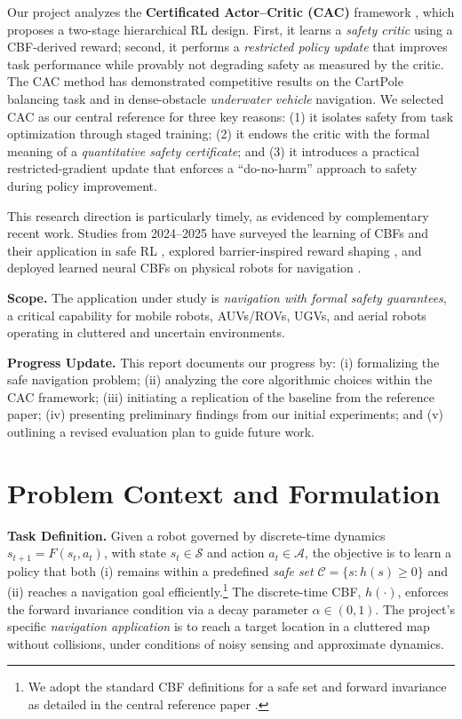 \documentclass[10pt,conference]{IEEEtran}
\begin{document}
Our project analyzes the \textbf{Certificated Actor--Critic (CAC)} framework \cite{Xie2025CAC}, which proposes a two-stage hierarchical RL design. First, it learns a \emph{safety critic} using a CBF-derived reward; second, it performs a \emph{restricted policy update} that improves task performance while provably not degrading safety as measured by the critic. The CAC method has demonstrated competitive results on the CartPole balancing task and in dense-obstacle \emph{underwater vehicle} navigation. We selected CAC as our central reference for three key reasons: (1) it isolates safety from task optimization through staged training; (2) it endows the critic with the formal meaning of a \emph{quantitative safety certificate}; and (3) it introduces a practical restricted-gradient update that enforces a “do-no-harm” approach to safety during policy improvement.

This research direction is particularly timely, as evidenced by complementary recent work. Studies from 2024--2025 have surveyed the learning of CBFs and their application in safe RL \cite{Guerrier2024Survey}, explored barrier-inspired reward shaping \cite{Ranjan2024BarrierShaping}, and deployed learned neural CBFs on physical robots for navigation \cite{Harms2024NeuralCBF}.

\textbf{Scope.} The application under study is \emph{navigation with formal safety guarantees}, a critical capability for mobile robots, AUVs/ROVs, UGVs, and aerial robots operating in cluttered and uncertain environments.

\textbf{Progress Update.} This report documents our progress by: (i) formalizing the safe navigation problem; (ii) analyzing the core algorithmic choices within the CAC framework; (iii) initiating a replication of the baseline from the reference paper; (iv) presenting preliminary findings from our initial experiments; and (v) outlining a revised evaluation plan to guide future work.

\section{Problem Context and Formulation}

\textbf{Task Definition.} Given a robot governed by discrete-time dynamics $s_{t+1}=F(s_t,a_t)$, with state $s_t\in\mathcal{S}$ and action $a_t\in\mathcal{A}$, the objective is to learn a policy that both (i) remains within a predefined \emph{safe set} $\mathcal{C}=\{s: h(s)\ge 0\}$ and (ii) reaches a navigation goal efficiently.\footnote{We adopt the standard CBF definitions for a safe set and forward invariance as detailed in the central reference paper \cite{Xie2025CAC}.} The discrete-time CBF, $h(\cdot)$, enforces the forward invariance condition via a decay parameter $\alpha\in(0,1)$. The project’s specific \emph{navigation application} is to reach a target location in a cluttered map without collisions, under conditions of noisy sensing and approximate dynamics.
\end{document}
